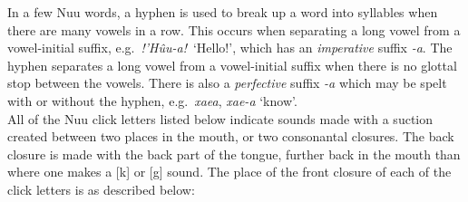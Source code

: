 In a few N\textipa{\textvertline}uu words, a hyphen is used to break
up a word into syllables when there are many vowels in a row. This
occurs when separating a long vowel from a vowel-initial suffix, e.g.\
\emph{!'H\^{u}u-a!}\ `Hello!', which has an \emph{imperative} suffix
\emph{-a}. The hyphen separates a long vowel from a vowel-initial
suffix when there is no glottal stop between the vowels. There is also
a \emph{perfective} suffix \emph{-a} which may be spelt with or
without the hyphen, e.g.\ \emph{\textipa{\textdoublevertline}xaea},
\emph{\textipa{\textdoublevertline}xae-a} `know'.\\

All of the N\textipa{\textvertline}uu click letters listed below
indicate sounds made with a suction created between two places in the
mouth, or two consonantal closures. The back closure is made with the
back part of the tongue, further back in the mouth than where one
makes a [k] or [g] sound. The place of the front closure of each of
the click letters is as described below:

\pagebreak

